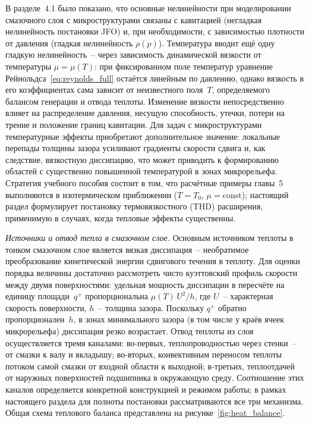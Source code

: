 В разделе~4.1 было показано, что основные нелинейности при
моделировании смазочного слоя с микроструктурами связаны
с кавитацией (негладкая нелинейность постановки JFO)
и, при необходимости, с зависимостью плотности от
давления (гладкая нелинейность $\rho(p)$). Температура
вводит ещё одну гладкую нелинейность~-- через зависимость
динамической вязкости от температуры $\mu = \mu(T)$:
при фиксированном поле температур уравнение
Рейнольдса~\eqref{eq:reynolds_full} остаётся линейным
по давлению, однако вязкость в его коэффициентах сама
зависит от неизвестного поля~$T$, определяемого балансом
генерации и отвода теплоты. Изменение вязкости
непосредственно влияет на распределение давления, несущую
способность, утечки, потери на трение и положение границ
кавитации. Для задач с микроструктурами температурные
эффекты приобретают дополнительное значение: локальные
перепады толщины зазора усиливают градиенты скорости сдвига
и, как следствие, вязкостную диссипацию, что может приводить
к формированию областей с существенно повышенной
температурой в зонах микрорельефа. Стратегия учебного пособия
состоит в том, что расчётные примеры главы~5 выполняются
в изотермическом приближении ($T = T_0$, $\mu = \mathrm{const}$);
настоящий раздел формулирует постановку термовязкостного
(THD) расширения, применимую в случаях, когда тепловые
эффекты существенны.

\textit{Источники и отвод тепла в смазочном слое.}
Основным источником теплоты в тонком смазочном слое является
вязкая диссипация~-- необратимое преобразование кинетической
энергии сдвигового течения в теплоту. Для оценки порядка
величины достаточно рассмотреть чисто куэттовский профиль
скорости между двумя поверхностями: удельная мощность
диссипации в пересчёте на единицу площади~$q^{+}$ пропорциональна $\mu(T)\,U^2/h$, где
$U$~-- характерная скорость поверхности, $h$~-- толщина
зазора. Поскольку $q^{+}$ обратно пропорционален~$h$,
в зонах минимального зазора (в том числе у краёв ячеек
микрорельефа) диссипация резко возрастает. Отвод теплоты
из слоя осуществляется тремя каналами: во-первых,
теплопроводностью через стенки~-- от смазки к валу
и вкладышу; во-вторых, конвективным переносом теплоты
потоком самой смазки от входной области к выходной;
в-третьих, теплоотдачей от наружных поверхностей подшипника
в окружающую среду. Соотношение этих каналов определяется
конкретной конструкцией и режимом работы; в рамках
настоящего раздела для полноты постановки рассматриваются
все три механизма. Общая схема теплового баланса
представлена на рисунке~\ref{fig:heat_balance}.

